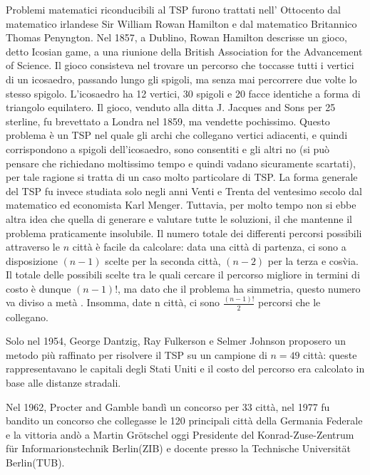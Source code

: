 \documentclass[11pt]{article}
\begin{document}
Problemi matematici riconducibili al TSP furono trattati nell' Ottocento dal matematico irlandese Sir William Rowan Hamilton e dal matematico Britannico Thomas Penyngton.  Nel 1857, a Dublino, Rowan Hamilton descrisse un gioco, detto Icosian game, a una riunione della British Association for the Advancement of Science. Il gioco consisteva nel trovare un percorso che toccasse tutti i vertici di un icosaedro, passando lungo gli spigoli, ma senza mai percorrere due volte lo stesso spigolo. L'icosaedro ha 12 vertici, 30 spigoli e 20 facce identiche a forma di triangolo equilatero.
Il gioco, venduto alla ditta J. Jacques and Sons per 25 sterline, fu brevettato a Londra nel 1859, ma vendette pochissimo. Questo problema è un TSP nel quale gli archi che collegano vertici adiacenti, e quindi corrispondono a spigoli dell'icosaedro, sono consentiti e gli altri no (si può pensare che richiedano moltissimo tempo e quindi vadano sicuramente scartati), per tale ragione si tratta di un caso molto particolare di TSP. La forma generale del TSP fu invece studiata solo negli anni Venti e Trenta del ventesimo secolo dal matematico ed economista Karl Menger. Tuttavia, per molto tempo non si ebbe altra idea che quella di generare e valutare tutte le soluzioni, il che mantenne il problema praticamente insolubile. Il numero totale dei differenti percorsi possibili attraverso le $n$ città è facile da calcolare: data una città di partenza, ci sono a disposizione $(n - 1)$ scelte per la seconda città, $(n - 2)$ per la terza e cos\` via. Il totale delle possibili scelte tra le quali cercare il percorso migliore in termini di costo è dunque $(n - 1)!$, ma dato che il problema ha simmetria, questo numero va diviso a metà . Insomma, date n città, ci sono $\frac{(n-1)!}{2}$ percorsi che le collegano.

Solo nel 1954, George Dantzig, Ray Fulkerson e Selmer Johnson proposero un metodo più raffinato per risolvere il TSP  su un campione di $n = 49$ città: queste rappresentavano le capitali degli Stati Uniti e il costo del percorso era calcolato in base alle distanze stradali. 

Nel 1962, Procter and Gamble bandì un concorso per 33 città, nel 1977 fu bandito un concorso che collegasse le 120 principali città della Germania Federale e la vittoria andò a Martin Gr\"otschel oggi Presidente del Konrad-Zuse-Zentrum f\"ur Informarionstechnik Berlin(ZIB) e docente presso la Technische Universit\"at Berlin(TUB).
\end{document}
